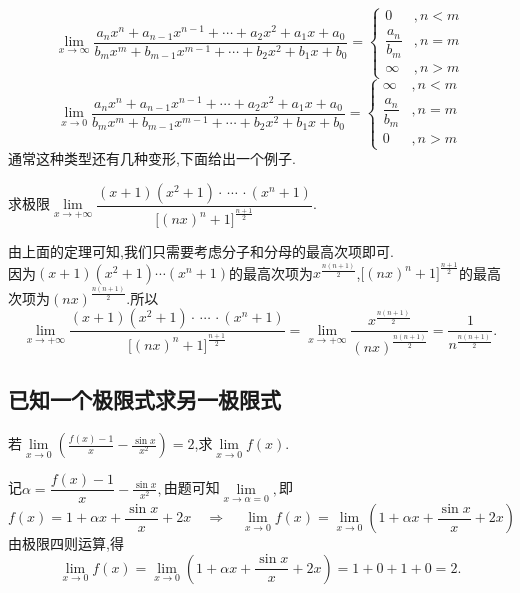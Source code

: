 \theorem[分数型极限]
\begin{equation}
\lim\limits_{x \to \infty}\frac{a_nx^n+a_{n-1}x^{n-1}+\cdots+a_2x^2+a_1x+a_0}{b_mx^m+b_{m-1}x^{m-1}+\cdots+b_2x^2+b_1x+b_0}=
\begin{cases}
0&,n<m\\
\dfrac{a_n}{b_m}&,n=m\\
\infty&,n>m
\end{cases}
\end{equation}
\begin{equation}
\lim\limits_{x \to 0}\frac{a_nx^n+a_{n-1}x^{n-1}+\cdots+a_2x^2+a_1x+a_0}{b_mx^m+b_{m-1}x^{m-1}+\cdots+b_2x^2+b_1x+b_0}=
\begin{cases}
\infty&,n<m\\
\dfrac{a_n}{b_m}&,n=m\\
0&,n>m
\end{cases}
\end{equation}
通常这种类型还有几种变形,下面给出一个例子.

\examples 求极限$\lim\limits_{x \to +\infty}\dfrac{(x+1)(x^2+1)\cdot\,\cdots\,\cdot(x^n+1)}{\big[(nx)^n+1\big]^{\frac{n+1}{2}}}$.

\solve 由上面的定理可知,我们只需要考虑分子和分母的最高次项即可.\\[0.5em]
因为$(x+1)(x^2+1)\cdots(x^n+1)$的最高次项为$\displaystyle x^{\frac{n(n+1)}{2}}$,$\big[(nx)^n+1\big]^{\frac{n+1}{2}}$的最高次项为$\displaystyle (nx)^{\frac{n(n+1)}{2}}$.所以
\[
\lim\limits_{x \to +\infty}\dfrac{(x+1)(x^2+1)\cdot\,\cdots\,\cdot(x^n+1)}{\big[(nx)^n+1\big]^{\frac{n+1}{2}}}=\lim\limits_{x \to +\infty}\dfrac{x^{\frac{n(n+1)}{2}}}{(nx)^{\frac{n(n+1)}{2}}}=\frac{1}{n^{\frac{n(n+1)}{2}}}.
\]
\sj
{}

\subsection{已知一个极限式求另一极限式}
\examples 若$\displaystyle \lim\limits_{x \to 0}\left(\frac{f(x)-1}{x}-\frac{\sin x}{x^2}\right)=2$,求$\lim\limits_{x \to 0}f(x).$

\solve 记$\alpha = \dfrac{f(x)-1}{x}-\frac{\sin x}{x^2},$由题可知$\lim\limits_{x \to \alpha =0},$即
\[
f(x)=1+\alpha x+\frac{\sin x}{x}+2x \quad \Rightarrow \quad \lim\limits_{x \to 0}f(x)=\lim\limits_{x \to 0}\left( 1+ \alpha x +\frac{\sin x}{x} +2x\right) 
\]
由极限四则运算,得
\[
\lim\limits_{x \to 0}f(x)=\lim\limits_{x \to 0}\left( 1+ \alpha x +\frac{\sin x}{x} +2x\right) =1+0+1+0=2.
\]
\sj
{}


